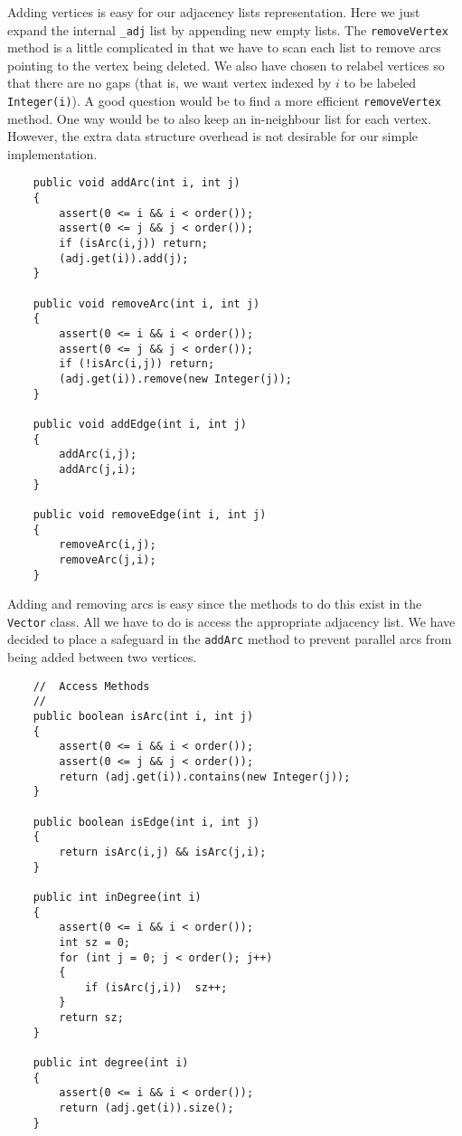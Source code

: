 Adding vertices is easy for our adjacency lists representation.   Here we
just expand the internal \verb|_adj| list by appending new empty lists.
The \verb|removeVertex| method is a little complicated in that we have
to scan each list to remove arcs pointing to the vertex being deleted.
We also have chosen to relabel vertices so that there are no gaps (that
is, we want vertex indexed by $i$ to be labeled \verb|Integer(i)|).  A good
question would be to find a more efficient \verb|removeVertex| method.
One way would be to also keep an in-neighbour list for each vertex.
However, the  extra data structure overhead is not desirable for our
simple implementation.

{\renewcommand{\ttdefault}{pcr} %
\footnotesize \begin{verbatim}
    public void addArc(int i, int j)
    {
        assert(0 <= i && i < order());
        assert(0 <= j && j < order());
        if (isArc(i,j)) return;
        (adj.get(i)).add(j);
    }

    public void removeArc(int i, int j)
    {
        assert(0 <= i && i < order());
        assert(0 <= j && j < order());
        if (!isArc(i,j)) return;
        (adj.get(i)).remove(new Integer(j));
    }

    public void addEdge(int i, int j)
    {
        addArc(i,j);
        addArc(j,i);
    }

    public void removeEdge(int i, int j)
    {
        removeArc(i,j);
        removeArc(j,i);
    }
\end{verbatim}%
}

Adding and removing arcs is easy since the methods to do this 
exist in the \verb|Vector| class.  All we have to do 
is access the appropriate adjacency list.   We have decided
to place a safeguard in the \verb|addArc| method to prevent parallel
arcs from being added between two vertices.

{\renewcommand{\ttdefault}{pcr} %
\footnotesize \begin{verbatim}
    //  Access Methods
    //
    public boolean isArc(int i, int j)
    {
        assert(0 <= i && i < order());
        assert(0 <= j && j < order());
        return (adj.get(i)).contains(new Integer(j));
    }

    public boolean isEdge(int i, int j)
    {
        return isArc(i,j) && isArc(j,i);
    }

    public int inDegree(int i)
    {
        assert(0 <= i && i < order());
        int sz = 0;
        for (int j = 0; j < order(); j++)
        {
            if (isArc(j,i))  sz++;
        }
        return sz;
    }

    public int degree(int i)
    {
        assert(0 <= i && i < order());
        return (adj.get(i)).size();
    }
\end{verbatim}%
}

